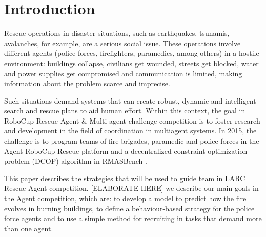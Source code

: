 \section{Introduction}
\label{sec:intro}

Rescue operations in disaster situations, such as earthquakes, tsunamis, avalanches, for example, are a serious social issue. These operations involve different agents (police forces, firefighters, paramedics, among others) in a hostile environment: buildings collapse, civilians get wounded, streets get blocked, water and power supplies get compromised and communication is limited, making information about the problem scarce and imprecise.

Such situations demand systems that can create robust, dynamic and intelligent search and rescue plans to aid human effort. Within this context, the goal in RoboCup Rescue Agent \& Multi-agent challenge competition is to foster research and development in the field of coordination in multiagent systems. In 2015, the challenge is to program teams of fire brigades, paramedic and police forces in the Agent RoboCup Rescue platform \cite{Kitano2000} and a decentralized constraint optimization problem (DCOP) algorithm in RMASBench \cite{Kleiner+2013}. 


This paper describes the strategies that will be used to guide \teamname team in  LARC Rescue Agent competition. [ELABORATE HERE] we describe our main goals in the Agent competition, which are: to develop a model to predict how the fire evolves in burning buildings, to define a behaviour-based strategy for the police force agents %
and to use a simple  method for recruiting in tasks that demand more than one agent. %
